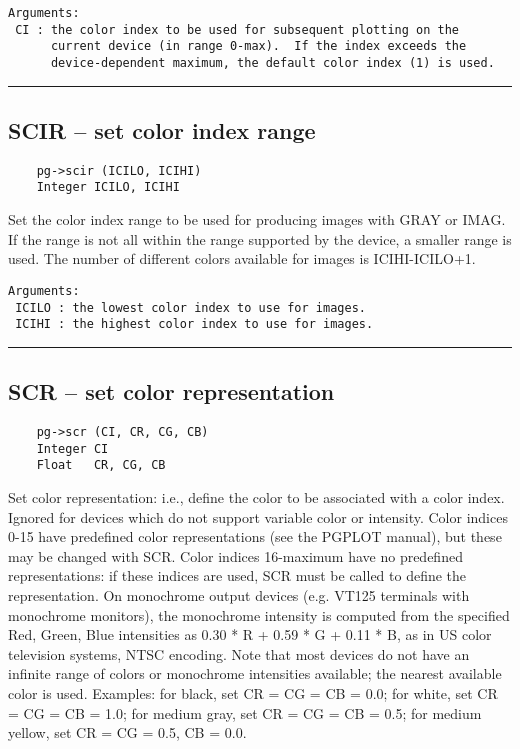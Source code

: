 \begin{verbatim}
Arguments:
 CI : the color index to be used for subsequent plotting on the
      current device (in range 0-max).  If the index exceeds the
      device-dependent maximum, the default color index (1) is used. 
\end{verbatim}

\hrule

\subsection*{SCIR -- set color index range }

\begin{verbatim}
    pg->scir (ICILO, ICIHI)
    Integer ICILO, ICIHI
\end{verbatim}

Set the color index range to be used for producing images with GRAY or
IMAG.  If the range is not all within the range supported by the
device, a smaller range is  used.  The number of different colors
available for images is ICIHI-ICILO+1.

\begin{verbatim}
Arguments:
 ICILO : the lowest color index to use for images.
 ICIHI : the highest color index to use for images.
\end{verbatim}

\hrule

\subsection*{SCR -- set color representation }

\begin{verbatim}
    pg->scr (CI, CR, CG, CB)
    Integer CI
    Float   CR, CG, CB
\end{verbatim}

Set color representation: i.e., define the color to be associated with
a color index.  Ignored for devices which do not support variable
color or intensity.  Color indices 0-15 have predefined color
representations (see the PGPLOT manual), but these may be changed with
SCR.  Color indices 16-maximum have no predefined representations: if
these indices are used, SCR must be called to define the
representation.  On monochrome output devices (e.g. VT125 terminals
with monochrome monitors), the monochrome intensity is computed from
the specified Red, Green, Blue intensities as 0.30 * R + 0.59 * G +
0.11 * B, as in US color television systems, NTSC encoding.  Note that
most devices do not have an infinite range of colors or monochrome
intensities available; the nearest available color is used.  Examples:
for black, set CR = CG = CB = 0.0; for white, set CR = CG = CB = 1.0;
for medium gray, set CR = CG = CB = 0.5; for medium yellow, set CR =
CG = 0.5, CB = 0.0.

